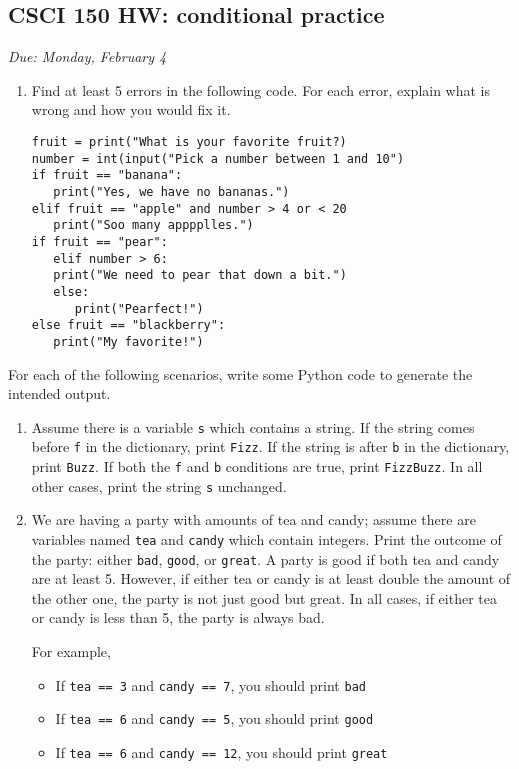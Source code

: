 \documentclass[]{article}
\date{}
\providecommand{\tightlist}{%
  \setlength{\itemsep}{0pt}\setlength{\parskip}{0pt}}
\begin{document}
\subsection{CSCI 150 HW: conditional
practice}\label{csci-150-hw-conditional-practice}

\emph{Due: Monday, February 4}

\begin{enumerate}
\def\labelenumi{\arabic{enumi}.}
\item
  Find at least 5 errors in the following code. For each error, explain
  what is wrong and how you would fix it.

\begin{verbatim}
fruit = print("What is your favorite fruit?)
number = int(input("Pick a number between 1 and 10")
if fruit == "banana":
   print("Yes, we have no bananas.")
elif fruit == "apple" and number > 4 or < 20
   print("Soo many apppplles.")
if fruit == "pear":
   elif number > 6:
   print("We need to pear that down a bit.")
   else:
      print("Pearfect!")
else fruit == "blackberry":
   print("My favorite!")
\end{verbatim}
\end{enumerate}

For each of the following scenarios, write some Python code to generate
the intended output.

\begin{enumerate}
\def\labelenumi{\arabic{enumi}.}
\setcounter{enumi}{1}
\item
  Assume there is a variable \texttt{s} which contains a string. If the
  string comes before \texttt{f} in the dictionary, print \texttt{Fizz}.
  If the string is after \texttt{b} in the dictionary, print
  \texttt{Buzz}. If both the \texttt{f} and \texttt{b} conditions are
  true, print \texttt{FizzBuzz}. In all other cases, print the string
  \texttt{s} unchanged.
\item
  We are having a party with amounts of tea and candy; assume there are
  variables named \texttt{tea} and \texttt{candy} which contain
  integers. Print the outcome of the party: either \texttt{bad},
  \texttt{good}, or \texttt{great}. A party is good if both tea and
  candy are at least 5. However, if either tea or candy is at least
  double the amount of the other one, the party is not just good but
  great. In all cases, if either tea or candy is less than 5, the party
  is always bad.

  For example,

  \begin{itemize}
  \tightlist
  \item
    If \texttt{tea\ ==\ 3} and \texttt{candy\ ==\ 7}, you should print
    \texttt{bad}
  \item
    If \texttt{tea\ ==\ 6} and \texttt{candy\ ==\ 5}, you should print
    \texttt{good}
  \item
    If \texttt{tea\ ==\ 6} and \texttt{candy\ ==\ 12}, you should print
    \texttt{great}
  \end{itemize}
\end{enumerate}
\end{document}

